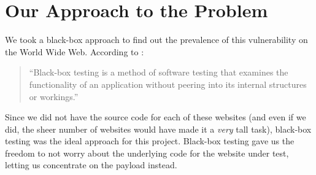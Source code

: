 \section[Approach]{Our Approach to the Problem}
\label{sys:appr}
We took a black-box approach to find out the prevalence of this vulnerability on the World Wide Web. According to \cite{wiki:Black-box_testing}:
\begin{quote}
	``{Black-box testing is a method of software testing that examines the functionality of an application without peering into its internal structures or workings.}''
\end{quote} 

Since we did not have the source code for each of these websites (and even if we did, the sheer number of websites would have made it a \emph{very} tall task), black-box testing was the ideal approach for this project.
Black-box testing gave us the freedom to not worry about the underlying code for the website under test, letting us concentrate on the payload instead.